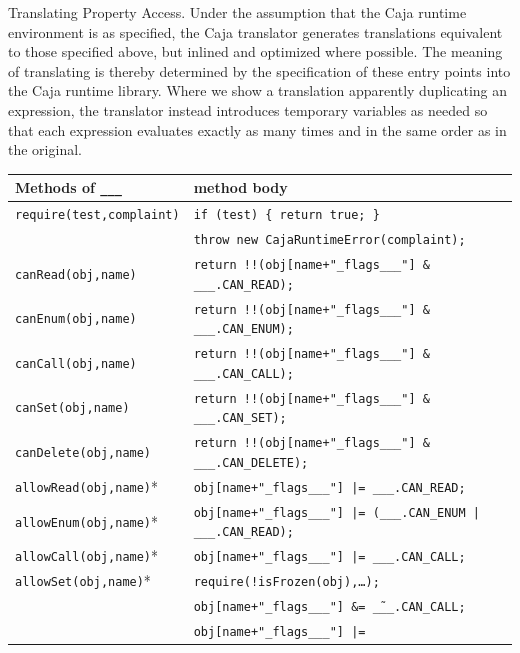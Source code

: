 \documentclass[letterpaper,twocolumn,10pt]{article}
\newcommand{\code}[1]{{\tt {#1}}}              %
\begin{document}
\begin{table}
\caption[Translating Property Access]{Translating Property Access. Under the 
assumption that the Caja runtime environment is as specified, the Caja 
translator generates translations equivalent to those specified above, but 
inlined and optimized where possible. The meaning of translating is thereby 
determined by the specification of these entry points into the Caja runtime 
library. Where we show a translation apparently duplicating an expression,
the translator instead introduces temporary variables as needed so that
each expression evaluates exactly as many times and in the same order as in
the original.}
\label{tab:prop-xlate}
\end{table}


\begin{table}
\begin{tabular}{ll}
  Methods of \code{\_\_\_}  & method body \\ 
  \hline 
  \code{require(test,complaint)}
       & \code{if (test)\ \{ return true; \}} \\
       & \code{throw new CajaRuntimeError(complaint);} \\
  \hline
  \code{canRead(obj,name)}  
       & \code{return !!(obj[name+"\_flags\_\_\_"] \& \_\_\_.CAN\_READ);} \\
  \code{canEnum(obj,name)}
       & \code{return !!(obj[name+"\_flags\_\_\_"] \& \_\_\_.CAN\_ENUM);} \\
  \code{canCall(obj,name)}
       & \code{return !!(obj[name+"\_flags\_\_\_"] \& \_\_\_.CAN\_CALL);} \\
  \code{canSet(obj,name)}
       & \code{return !!(obj[name+"\_flags\_\_\_"] \& \_\_\_.CAN\_SET);} \\
  \code{canDelete(obj,name)}
       & \code{return !!(obj[name+"\_flags\_\_\_"] \& \_\_\_.CAN\_DELETE);} \\
  \hline
  \code{allowRead(obj,name)}* 
       & \code{obj[name+"\_flags\_\_\_"] |= \_\_\_.CAN\_READ;} \\
  \code{allowEnum(obj,name)}* 
       & \code{obj[name+"\_flags\_\_\_"] |= (\_\_\_.CAN\_ENUM | \_\_\_.CAN\_READ);} \\
  \code{allowCall(obj,name)}* 
       & \code{obj[name+"\_flags\_\_\_"] |= \_\_\_.CAN\_CALL;} \\
  \code{allowSet(obj,name)}* 
       & \code{require(!isFrozen(obj),\ldots);} \\
       & \code{obj[name+"\_flags\_\_\_"] \&= \~\_\_\_.CAN\_CALL;} \\
       & \code{obj[name+"\_flags\_\_\_"] |= }\\

\end{tabular}
\end{table}
\end{document}
